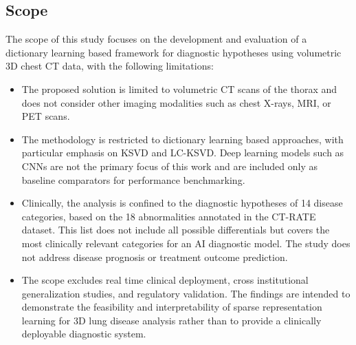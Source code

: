 \subsection{Scope}
The scope of this study focuses on the development and evaluation of a dictionary learning based framework
for diagnostic hypotheses using volumetric 3D chest CT data, with the following limitations:

\begin{itemize}
    \item The proposed solution is limited to volumetric CT scans of the thorax and does not consider other imaging modalities
    such as chest X-rays, MRI, or PET scans.
    \item The methodology is restricted to dictionary learning based approaches, with particular emphasis on KSVD and LC-KSVD.
    Deep learning models such as CNNs are not the primary focus of this work and are included only as baseline
    comparators for performance benchmarking.
    \item Clinically, the analysis is confined to the diagnostic hypotheses of 14 disease categories, based on the
    18 abnormalities annotated in the CT-RATE dataset. This list does not include all possible differentials but covers the most
    clinically relevant categories for an AI diagnostic model. The study does not address disease prognosis or treatment outcome prediction.
    \item The scope excludes real time clinical deployment, cross institutional generalization studies, and regulatory validation.
    The findings are intended to demonstrate the feasibility and interpretability of sparse representation learning for 3D lung
    disease analysis rather than to provide a clinically deployable diagnostic system.
\end{itemize}
